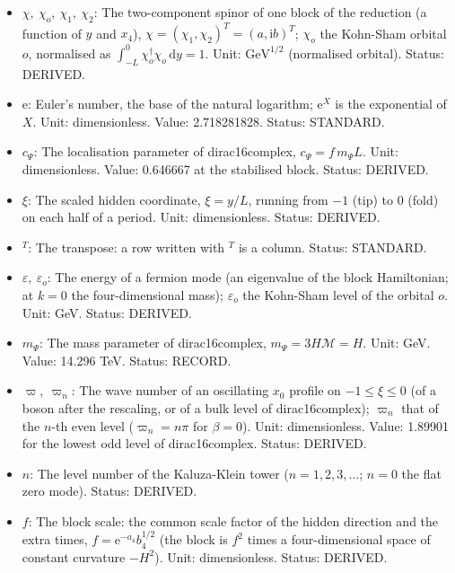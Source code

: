 \documentclass[
  10pt,
]{article}
\providecommand{\tightlist}{%
  \setlength{\itemsep}{0pt}\setlength{\parskip}{0pt}}
\begin{document}
\begin{itemize}
\tightlist
\item
  \(\chi,\ \chi_o,\ \chi_1,\ \chi_2\): The two-component spinor of one
  block of the reduction (a function of \(y\) and \(x_4\)),
  \(\chi = (\chi_1, \chi_2)^T = (a, \mathrm{i}b)^T\); \(\chi_o\) the
  Kohn-Sham orbital \(o\), normalised as
  \(\int_{-L}^{0}\chi_o^\dagger\chi_o\,\mathrm{d}y = 1\). Unit:
  \(\mathrm{GeV}^{1/2}\) (normalised orbital). Status: DERIVED.
\item
  \(\mathrm{e}\): Euler's number, the base of the natural logarithm;
  \(\mathrm{e}^{X}\) is the exponential of \(X\). Unit: dimensionless.
  Value: 2.718281828. Status: STANDARD.
\item
  \(c_\Psi\): The localisation parameter of dirac16complex,
  \(c_\Psi = f\,m_\Psi L\). Unit: dimensionless. Value: 0.646667 at the
  stabilised block. Status: DERIVED.
\item
  \(\xi\): The scaled hidden coordinate, \(\xi = y/L\), running from
  \(-1\) (tip) to \(0\) (fold) on each half of a period. Unit:
  dimensionless. Status: DERIVED.
\item
  \({}^T\): The transpose: a row written with \(^T\) is a column.
  Status: STANDARD.
\item
  \(\varepsilon,\ \varepsilon_o\): The energy of a fermion mode (an
  eigenvalue of the block Hamiltonian; at \(k = 0\) the four-dimensional
  mass); \(\varepsilon_o\) the Kohn-Sham level of the orbital \(o\).
  Unit: GeV. Status: DERIVED.
\item
  \(m_\Psi\): The mass parameter of dirac16complex,
  \(m_\Psi = 3H\mathcal{M} = H\). Unit: GeV. Value: 14.296 TeV. Status:
  RECORD.
\item
  \(\varpi,\ \varpi_n\): The wave number of an oscillating \(x_0\)
  profile on \(-1 \le \xi \le 0\) (of a boson after the rescaling, or of
  a bulk level of dirac16complex); \(\varpi_n\) that of the \(n\)-th
  even level (\(\varpi_n = n\pi\) for \(\beta = 0\)). Unit:
  dimensionless. Value: 1.89901 for the lowest odd level of
  dirac16complex. Status: DERIVED.
\item
  \(n\): The level number of the Kaluza-Klein tower
  (\(n = 1, 2, 3, \dots\); \(n = 0\) the flat zero mode). Status:
  DERIVED.
\item
  \(f\): The block scale: the common scale factor of the hidden
  direction and the extra times, \(f = \mathrm{e}^{-a_4}b_4^{1/2}\) (the
  block is \(f^2\) times a four-dimensional space of constant curvature
  \(-H^2\)). Unit: dimensionless. Status: DERIVED.

\end{itemize}
\end{document}
